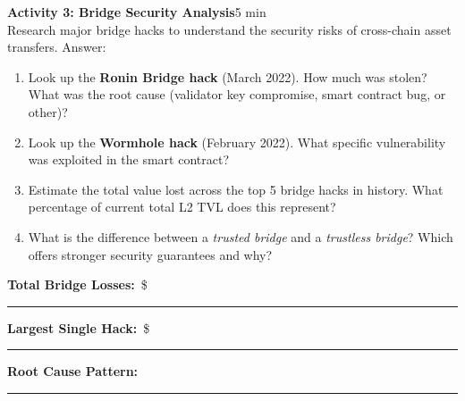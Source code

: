 \documentclass[11pt,a4paper]{article}
\newcommand{\activitybox}[3]{%
  \noindent\colorbox{mllavender4}{\parbox{\dimexpr\linewidth-2\fboxsep}{%
    \textbf{\color{mlpurple}#1}\hfill\textcolor{mlgray}{\small #2}\\[2pt]#3%
  }}\par\vspace{4pt}%
}
\newcommand{\fillcell}{\rule{2.2cm}{0.3pt}}
\begin{document}
\activitybox{Activity 3: Bridge Security Analysis}{5 min}{%
Research major bridge hacks to understand the security risks of cross-chain asset transfers. Answer:
\begin{enumerate}
\item Look up the \textbf{Ronin Bridge hack} (March 2022). How much was stolen? What was the root cause (validator key compromise, smart contract bug, or other)?
\item Look up the \textbf{Wormhole hack} (February 2022). What specific vulnerability was exploited in the smart contract?
\item Estimate the total value lost across the top 5 bridge hacks in history. What percentage of current total L2 TVL does this represent?
\item What is the difference between a \textit{trusted bridge} and a \textit{trustless bridge}? Which offers stronger security guarantees and why?
\end{enumerate}
\vspace{4pt}
\noindent
\textbf{Total Bridge Losses:}~\$\fillcell\quad
\textbf{Largest Single Hack:}~\$\fillcell\quad
\textbf{Root Cause Pattern:}~\fillcell
\vspace{2pt}
}

\vspace{2pt}
\end{document}
